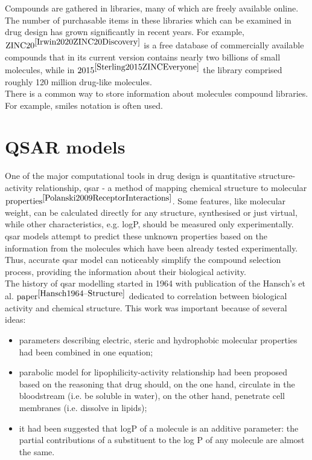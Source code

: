 Compounds are gathered in libraries, many of which are freely available online.
The number of purchasable items in these libraries which can be examined in drug 
design has grown significantly in recent years.
For example, $\text{ZINC20}^{\cite{Irwin2020ZINC20Discovery}}$ is a free database 
of commercially available compounds that in its current version contains nearly 
two billions of small molecules, while in $\text{2015}^{\cite{Sterling2015ZINCEveryone}}$ 
the library comprised roughly 120 million drug-like molecules.
\hfill\break\\
There is a common way to store information about molecules compound libraries.
For example, \acrshort{smiles} notation is often used.\\

\section{QSAR models}
One of the major computational tools in drug design is quantitative structure-activity 
relationship, \acrshort{qsar} - a method of mapping chemical structure to molecular 
$\text{properties}^{\cite{Polanski2009ReceptorInteractions}}$. 
Some features, like molecular weight, can be calculated directly for any structure, 
synthesised or just virtual, while other characteristics, e.g. logP, should be measured 
only experimentally.
\acrshort{qsar} models attempt to predict these unknown properties based on the information from the molecules which have been already tested experimentally.
Thus, accurate \acrshort{qsar} model can noticeably simplify the compound selection 
process, providing the information about their biological activity.\\

The history of \acrshort{qsar} modelling started in 1964 with publication of the 
Hansch's et al. $\text{paper}^{\cite{Hansch1964--Structure}}$ dedicated to correlation 
between biological activity and chemical structure.
This work was important because of several ideas:
\begin{itemize}

    \item  parameters describing electric, steric and hydrophobic molecular properties had been combined in one equation;
    \item parabolic model for lipophilicity-activity relationship had been proposed based on the reasoning that drug should, on the one hand, circulate in the bloodstream (i.e. be soluble in water), on the other hand, penetrate cell membranes (i.e. dissolve in lipids); 
    \item it had been suggested that logP of a molecule is an additive parameter: the partial contributions of a substituent to the log P of any molecule are almost the same.
\end{itemize}

